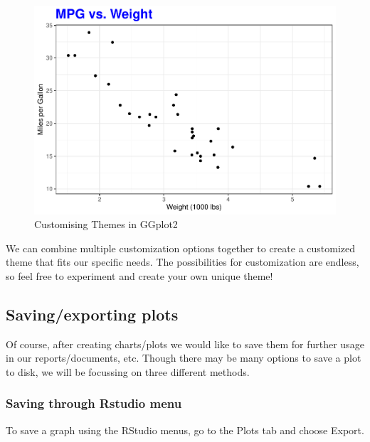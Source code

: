 \documentclass[
]{book}
\begin{document}
\begin{figure}

{\centering \includegraphics[width=0.49\linewidth]{DauR_files/figure-latex/theme2-1} 

}

\caption{Customising Themes in GGplot2}\label{fig:theme2}
\end{figure}

We can combine multiple customization options together to create a customized theme that fits our specific needs. The possibilities for customization are endless, so feel free to experiment and create your own unique theme!

\hypertarget{savingexporting-plots}{%
\subsection{Saving/exporting plots}\label{savingexporting-plots}}

Of course, after creating charts/plots we would like to save them for further usage in our reports/documents, etc. Though there may be many options to save a plot to disk, we will be focussing on three different methods.

\hypertarget{saving-through-rstudio-menu}{%
\subsubsection*{Saving through Rstudio menu}\label{saving-through-rstudio-menu}}

To save a graph using the RStudio menus, go to the Plots tab and choose Export.
\end{document}
